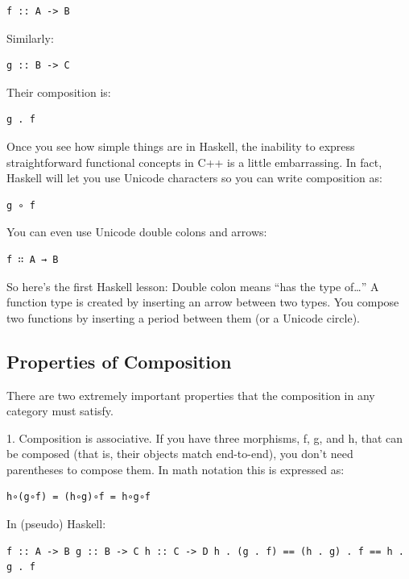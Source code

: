 \begin{verbatim}
f :: A -> B
\end{verbatim}

Similarly:

\begin{verbatim}
g :: B -> C
\end{verbatim}

Their composition is:

\begin{verbatim}
g . f
\end{verbatim}

Once you see how simple things are in Haskell, the inability to express
straightforward functional concepts in C++ is a little embarrassing. In
fact, Haskell will let you use Unicode characters so you can write
composition as:

\begin{verbatim}
g ∘ f
\end{verbatim}

You can even use Unicode double colons and arrows:

\begin{verbatim}
f ∷ A → B
\end{verbatim}

So here's the first Haskell lesson: Double colon means ``has the type
of\ldots{}'' A function type is created by inserting an arrow between
two types. You compose two functions by inserting a period between them
(or a Unicode circle).

\subsection{Properties of Composition}\label{properties-of-composition}

There are two extremely important properties that the composition in any
category must satisfy.

1. Composition is associative. If you have three morphisms, f, g, and h,
that can be composed (that is, their objects match end-to-end), you
don't need parentheses to compose them. In math notation this is
expressed as:

\begin{verbatim}
h∘(g∘f) = (h∘g)∘f = h∘g∘f
\end{verbatim}

In (pseudo) Haskell:

\begin{verbatim}
f :: A -> B g :: B -> C h :: C -> D h . (g . f) == (h . g) . f == h . g . f
\end{verbatim}

